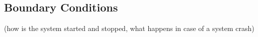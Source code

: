 \documentclass[a4paper]{article}
\begin{document}


\subsection{Boundary Conditions}
(how is the system started and stopped, what happens
in case of a system crash)
\end{document}

